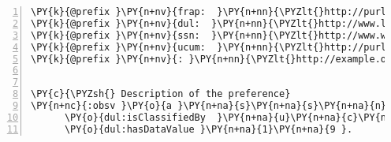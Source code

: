 \expandafter\def\csname PY@tok@err\endcsname{}
{\small
\begin{Verbatim}[commandchars=\\\{\},numbers=left,firstnumber=1,stepnumber=1]
\PY{k}{@prefix }\PY{n+nv}{frap:  }\PY{n+nn}{\PYZlt{}http://purl.org/frap/\PYZgt{} .}
\PY{k}{@prefix }\PY{n+nv}{dul:  }\PY{n+nn}{\PYZlt{}http://www.loa.istc.cnr.it/ontologies/DUL.owl\PYZsh{}\PYZgt{} .}
\PY{k}{@prefix }\PY{n+nv}{ssn:  }\PY{n+nn}{\PYZlt{}http://www.w3.org/2005/Incubator/ssn/ssnx/ssn\PYZsh{}\PYZgt{} .}
\PY{k}{@prefix }\PY{n+nv}{ucum:  }\PY{n+nn}{\PYZlt{}http://purl.oclc.org/NET/muo/ucum/\PYZgt{} .}
\PY{k}{@prefix }\PY{n+nv}{: }\PY{n+nn}{\PYZlt{}http://example.org/lamp/\PYZgt{}.}


\PY{c}{\PYZsh{} Description of the preference}
\PY{n+nc}{:obsv }\PY{o}{a }\PY{n+na}{s}\PY{n+na}{s}\PY{n+na}{n}\PY{n+na}{:}\PY{n+na}{O}\PY{n+na}{b}\PY{n+na}{s}\PY{n+na}{e}\PY{n+na}{r}\PY{n+na}{v}\PY{n+na}{a}\PY{n+na}{t}\PY{n+na}{i}\PY{n+na}{o}\PY{n+na}{n}\PY{n+na}{V}\PY{n+na}{a}\PY{n+na}{l}\PY{n+na}{u}\PY{n+na}{e}\PY{err}{,}\PY{n+na}{ f}\PY{n+na}{r}\PY{n+na}{a}\PY{n+na}{p}\PY{n+na}{:}\PY{n+na}{P}\PY{n+na}{r}\PY{n+na}{e}\PY{n+na}{f}\PY{n+na}{e}\PY{n+na}{r}\PY{n+na}{e}\PY{n+na}{n}\PY{n+na}{c}\PY{n+na}{e };
      \PY{o}{dul:isClassifiedBy  }\PY{n+na}{u}\PY{n+na}{c}\PY{n+na}{u}\PY{n+na}{m}\PY{n+na}{:}\PY{n+na}{l}\PY{n+na}{u}\PY{n+na}{x };
      \PY{o}{dul:hasDataValue }\PY{n+na}{1}\PY{n+na}{9 }. 
\end{Verbatim}
}